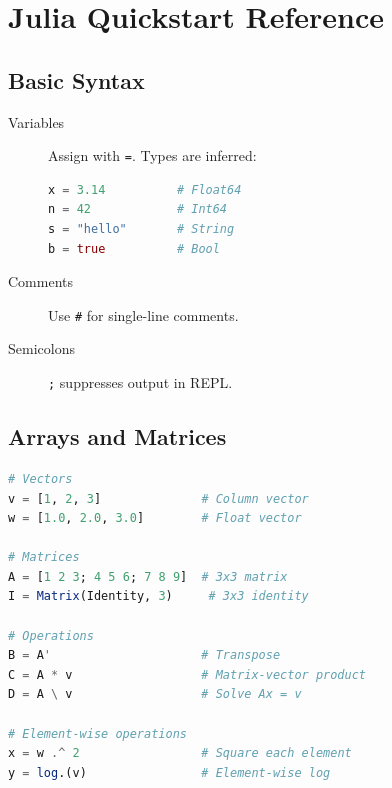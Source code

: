 \chapter{Julia Quickstart Reference}
\label{app:julia}

\begin{abstract}
This appendix provides a rapid-reference guide to Julia syntax for scientists and engineers. Every chapter in this book includes Julia code; this appendix ensures you can follow along even if you are new to the language.
\end{abstract}

\section{Basic Syntax}
\label{app:julia:syntax}

\begin{description}
    \item[Variables] Assign with \texttt{=}. Types are inferred:
    \begin{lstlisting}[language=Julia]
x = 3.14          # Float64
n = 42            # Int64
s = "hello"       # String
b = true          # Bool
    \end{lstlisting}
    \item[Comments] Use \texttt{\#} for single-line comments.
    \item[Semicolons] \texttt{;} suppresses output in REPL.
\end{description}

\section{Arrays and Matrices}
\label{app:julia:arrays}

\begin{lstlisting}[language=Julia]
# Vectors
v = [1, 2, 3]              # Column vector
w = [1.0, 2.0, 3.0]        # Float vector

# Matrices
A = [1 2 3; 4 5 6; 7 8 9]  # 3x3 matrix
I = Matrix(Identity, 3)     # 3x3 identity

# Operations
B = A'                     # Transpose
C = A * v                  # Matrix-vector product
D = A \ v                  # Solve Ax = v

# Element-wise operations
x = w .^ 2                 # Square each element
y = log.(v)                # Element-wise log
    \end{lstlisting}

